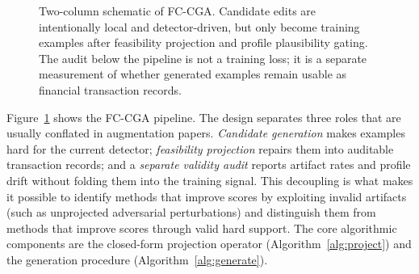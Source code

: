 \documentclass[sigconf,review,anonymous]{acmart}
\newcommand{\fcca}{\textsc{FC-CGA}\xspace}
\begin{document}
\begin{figure}[t]
\caption{Two-column schematic of \fcca. Candidate edits are intentionally local
and detector-driven, but only become training examples after feasibility
projection and profile plausibility gating. The audit below the pipeline is not
a training loss; it is a separate measurement of whether generated examples
remain usable as financial transaction records.}
\label{fig:pipeline}
\end{figure}

Figure~\ref{fig:pipeline} shows the \fcca pipeline. The design separates three
roles that are usually conflated in augmentation papers. \emph{Candidate
generation} makes examples hard for the current detector; \emph{feasibility
projection} repairs them into auditable transaction records; and a
\emph{separate validity audit} reports artifact rates and profile drift
without folding them into the training signal. This decoupling is what makes
it possible to identify methods that improve scores by exploiting invalid
artifacts (such as unprojected adversarial perturbations) and distinguish
them from methods that improve scores through valid hard support. The core
algorithmic components are the closed-form projection operator
(Algorithm~\ref{alg:project}) and the generation procedure
(Algorithm~\ref{alg:generate}).
\end{document}
